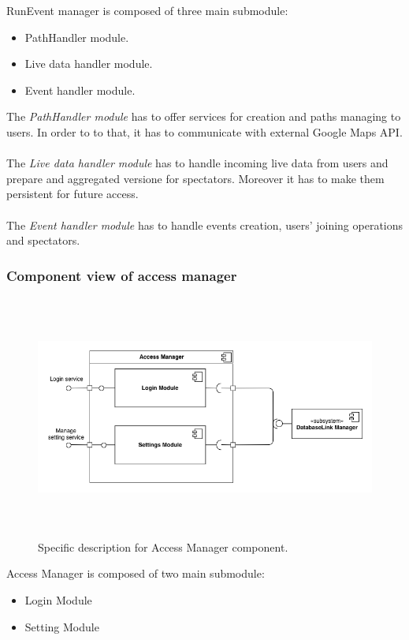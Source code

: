\documentclass[DD.tex]{subfiles}
\begin{document}
RunEvent manager is composed of three main submodule: \begin{itemize}
	\item PathHandler module.
	\item Live data handler module.
	\item Event handler module.
\end{itemize}

The \textit{PathHandler module} has to offer services for creation and paths managing to users. In order to to that, it has to communicate with external Google Maps API.\\\\
The \textit{Live data handler module} has to handle incoming live data from users and prepare and aggregated versione for spectators. Moreover it has to make them persistent for future access.\\\\
The \textit{Event handler module} has to handle events creation, users' joining operations and spectators.

\newpage
\subsubsection{Component view of access manager}
\begin{figure}[h!]
	\centering
	\includegraphics[height=8.00cm,keepaspectratio]{Figures/AccessManagerComponent}
	\caption{Specific description for Access Manager component.}
\end{figure}

Access Manager is composed of two main submodule: 
\begin{itemize}
	\item Login Module
	\item Setting Module
\end{itemize}
\end{document}
